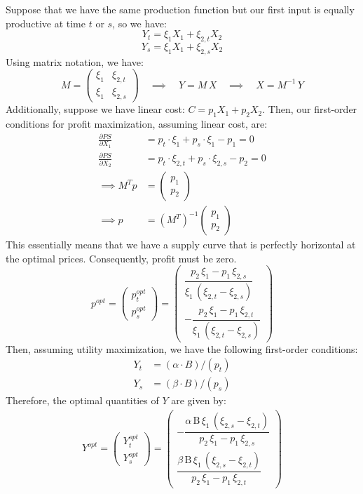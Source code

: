 \documentclass[12pt,a4paper]{extarticle}
\begin{document}
	
Suppose that we have the same production function but our first input is equally productive at time $t$ or $s$, so we have:
$$Y_t = \xi_{1} X_1 + \xi_{2,t} X_2$$
$$Y_s = \xi_{1} X_1 + \xi_{2,s} X_2$$
Using matrix notation, we have:
$$M = 
\begin{pmatrix}
\xi_1 & \xi_{2,t} \\
\xi_1 & \xi_{2,s}
\end{pmatrix}
\quad \implies \quad 
Y = M \, X \quad \implies \quad X = M^{-1} \, Y$$
Additionally, suppose we have linear cost: $C = p_1 X_1 + p_2 X_2$. 
Then, our first-order conditions for profit maximization, assuming linear cost, are:
\begin{align*}
\frac{\partial PS}{\partial X_1} &= p_t \cdot \xi_1  + p_s \cdot \xi_1 - p_1 = 0 \\
\frac{\partial PS}{\partial X_2} &= p_t \cdot \xi_{2,t}  + p_s \cdot \xi_{2,s} - p_2 = 0 \\
\implies M^T p &= 
\begin{pmatrix}
p_1 \\
p_2
\end{pmatrix} \\
\implies p &= (M^{T})^{-1} \begin{pmatrix}
p_1 \\
p_2
\end{pmatrix}
\end{align*}
This essentially means that we have a supply curve that is perfectly horizontal at the optimal prices. Consequently, profit must be zero. 
$$
p^{opt} = 
\begin{pmatrix}
p_t^{opt} \\
p_s^{opt}
\end{pmatrix}
=
\begin{pmatrix}
\dfrac{p_{2}\,\xi _{1}-p_{1}\,\xi _{2,s}}{\xi _{1}\,\left(\xi _{2,t}-\xi _{2,s}\right)}\\[2ex]
-\dfrac{p_{2}\,\xi _{1}-p_{1}\,\xi _{2,t}}{\xi _{1}\,\left(\xi _{2,t}-\xi _{2,s}\right)}
\end{pmatrix}
$$
Then, assuming utility maximization, we have the following first-order conditions:
\begin{align*}
Y_t &= (\alpha \cdot B) / (p_t) \\
Y_s &= (\beta \cdot B) / (p_s)
\end{align*}
Therefore, the optimal quantities of $Y$ are given by:
\begin{align*}
Y^{opt} = 
\begin{pmatrix}
Y_t^{opt} \\
Y_s^{opt} 
\end{pmatrix}
=
\begin{pmatrix}
-\dfrac{\alpha \,\mathrm{B}\,\xi _{1}\,\left(\xi _{2,s}-\xi _{2,t}\right)}{p_{2}\,\xi _{1}-p_{1}\,\xi _{2,s}}\\[2.5ex]
\dfrac{\beta\,\mathrm{B}\,\xi _{1}\,\left(\xi _{2,s}-\xi _{2,t}\right)}{p_{2}\,\xi _{1}-p_{1}\,\xi _{2,t}}
\end{pmatrix}
\end{align*}
\end{document}
